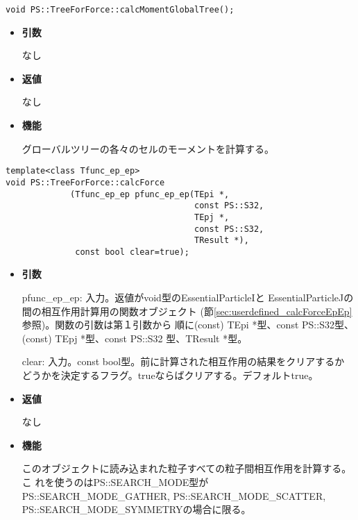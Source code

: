 
\begin{screen}
\begin{verbatim}
void PS::TreeForForce::calcMomentGlobalTree();
\end{verbatim}
\end{screen}

\begin{itemize}

\item {\bf 引数}

なし

\item {\bf 返値}

なし

\item {\bf 機能}

グローバルツリーの各々のセルのモーメントを計算する。

\end{itemize}


\begin{screen}
\begin{verbatim}
template<class Tfunc_ep_ep>
void PS::TreeForForce::calcForce
             (Tfunc_ep_ep pfunc_ep_ep(TEpi *,
                                      const PS::S32,
                                      TEpj *,
                                      const PS::S32,
                                      TResult *),
              const bool clear=true);
\end{verbatim}
\end{screen}

\begin{itemize}

\item {\bf 引数}

pfunc\_ep\_ep: 入力。返値がvoid型のEssentialParticleIと
EssentialParticleJの間の相互作用計算用の関数オブジェクト
(節\ref{sec:userdefined_calcForceEpEp}参照)。関数の引数は第１引数から
順に(const) TEpi *型、const PS::S32型、(const) TEpj *型、const PS::S32
型、TResult *型。

clear: 入力。const bool型。前に計算された相互作用の結果をクリアするか
どうかを決定するフラグ。trueならばクリアする。デフォルトtrue。

\item {\bf 返値}

なし

\item {\bf 機能}

このオブジェクトに読み込まれた粒子すべての粒子間相互作用を計算する。こ
れを使うのはPS::SEARCH\_MODE型がPS::SEARCH\_MODE\_GATHER,
PS::SEARCH\_MODE\_SCATTER, PS::SEARCH\_MODE\_SYMMETRYの場合に限る。

\end{itemize}

